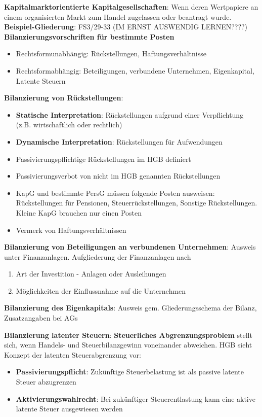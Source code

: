 \textbf{Kapitalmarktorientierte Kapitalgesellschaften}: Wenn deren Wertpapiere an einem
organisierten Markt zum Handel zugelassen oder beantragt wurde.\\
\textbf{Beispiel-Gliederung}: FS3/29-33 (IM ERNST AUSWENDIG LERNEN????)\\

\textbf{Bilanzierungsvorschriften für bestimmte Posten}
\begin{itemize}
	\item Rechtsformunabhängig: Rückstellungen, Haftungsverhältnisse
	\item Rechtsformabhängig: Beteiligungen, verbundene Unternehmen, Eigenkapital, Latente Steuern
\end{itemize}

\textbf{Bilanzierung von Rückstellungen}:
\begin{itemize}
	\item \textbf{Statische Interpretation}: Rückstellungen aufgrund einer Verpflichtung (z.B. wirtschaftlich oder rechtlich)
	\item \textbf{Dynamische Interpretation}: Rückstellungen für Aufwendungen
	\item Passivierungspflichtige Rückstellungen im HGB definiert
	\item Passivierungsverbot von nicht im HGB genannten Rückstellungen
	\item KapG und bestimmte PersG müssen folgende Posten ausweisen: Rückstellungen für Pensionen, Steuerrückstellungen, Sonstige Rückstellungen. Kleine KapG brauchen nur einen Posten
	\item Vermerk von Haftungsverhältnissen
\end{itemize}

\textbf{Bilanzierung von Beteiligungen an verbundenen Unternehmen}: Ausweis unter Finanzanlagen. Aufgliederung der Finanzanlagen nach
\begin{enumerate}
	\item Art der Investition - Anlagen oder Ausleihungen
	\item Möglichkeiten der Einflussnahme auf die Unternehmen
\end{enumerate}
\bigskip
\textbf{Bilanzierung des Eigenkapitals}: Ausweis gem. Gliederungsschema der Bilanz, Zusatzangaben bei AGs

\textbf{Bilanzierung latenter Steuern}: \textbf{Steuerliches Abgrenzungsproblem} stellt sich, wenn Handels- und Steuerbilanzgewinn voneinander abweichen. HGB sieht Konzept der latenten Steuerabgrenzung vor:
\begin{itemize}
	\item \textbf{Passivierungspflicht}: Zukünftige Steuerbelastung ist als passive latente Steuer abzugrenzen
	\item \textbf{Aktivierungswahlrecht}: Bei zukünftiger Steuerentlastung kann eine aktive latente Steuer ausgewiesen werden
\end{itemize}